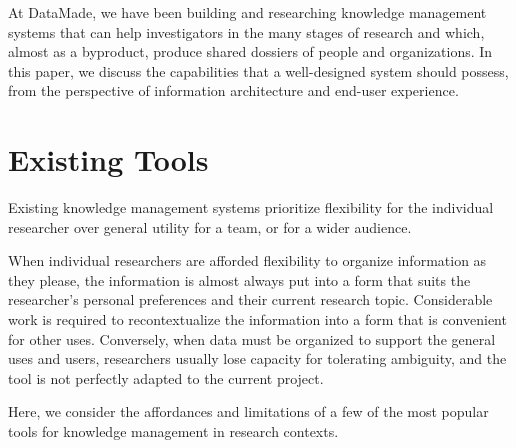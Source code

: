 \documentclass[format=siggraph, review=true]{acmart}
\begin{document}
At DataMade, we have been building and researching knowledge
management systems that can help investigators in the many stages
of research and which, almost as a byproduct, produce shared dossiers
of people and organizations. In this paper, we discuss the
capabilities that a well-designed system should possess, from the
perspective of information architecture and end-user experience.

\section{Existing Tools}
Existing knowledge management systems prioritize flexibility for the
individual researcher over general utility for a team, or for a wider
audience. 

When individual researchers are afforded flexibility to organize
information as they please, the information is almost always put into
a form that suits the researcher's personal preferences and their
current research topic. Considerable work is required to
recontextualize the information into a form that is convenient for
other uses. Conversely, when data must be organized to support the
general uses and users, researchers usually lose capacity for
tolerating ambiguity, and the tool is not perfectly adapted to the
current project.

Here, we consider the affordances and limitations of a few of the most
popular tools for knowledge management in research contexts.
\end{document}
